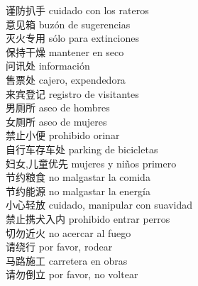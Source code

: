 谨防扒手 \quad cuidado con los rateros\\
意见箱 \quad buzón de sugerencias\\
灭火专用 \quad sólo para extinciones\\
保持干燥 \quad mantener en seco\\
问讯处 \quad información\\
售票处 \quad cajero, expendedora\\
来宾登记 \quad registro de visitantes\\
男厕所 \quad aseo de hombres\\
女厕所 \quad aseo de mujeres\\
禁止小便 \quad prohibido orinar\\
自行车存车处 \quad parking de bicicletas\\
妇女,儿童优先 \quad mujeres y niños primero\\
节约粮食 \quad no malgastar la comida\\
节约能源 \quad no malgastar la energía\\
小心轻放 \quad cuidado, manipular con suavidad\\
禁止携犬入内 \quad prohibido entrar perros\\
切勿近火 \quad no acercar al fuego\\
请绕行 \quad por favor, rodear\\
马路施工 \quad carretera en obras\\
请勿倒立 \quad por favor, no voltear\\